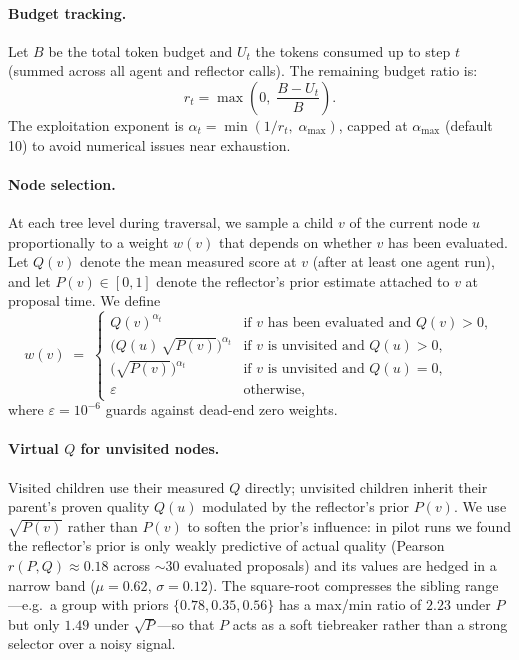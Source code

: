 \documentclass{article}
\begin{document}
\paragraph{Budget tracking.}
Let $B$ be the total token budget and $U_t$ the tokens consumed up to step $t$ (summed across all agent and reflector calls).
The remaining budget ratio is:
\[
    r_t = \max\!\left(0,\; \frac{B - U_t}{B}\right).
\]
The exploitation exponent is $\alpha_t = \min(1/r_t,\; \alpha_{\max})$, capped at $\alpha_{\max}$ (default 10) to avoid numerical issues near exhaustion.

\paragraph{Node selection.}
At each tree level during traversal, we sample a child $v$ of the current node $u$ proportionally to a weight $w(v)$ that depends on whether $v$ has been evaluated.
Let $Q(v)$ denote the mean measured score at $v$ (after at least one agent run), and let $P(v) \in [0,1]$ denote the reflector's prior estimate attached to $v$ at proposal time.
We define
\[
    w(v) \;=\; \begin{cases}
        Q(v)^{\alpha_t}                          & \text{if } v \text{ has been evaluated and } Q(v) > 0,\\[2pt]
        \bigl(Q(u)\,\sqrt{P(v)}\bigr)^{\alpha_t} & \text{if } v \text{ is unvisited and } Q(u) > 0,\\[2pt]
        \bigl(\sqrt{P(v)}\bigr)^{\alpha_t}       & \text{if } v \text{ is unvisited and } Q(u) = 0,\\[2pt]
        \varepsilon                              & \text{otherwise,}
    \end{cases}
\]
where $\varepsilon = 10^{-6}$ guards against dead-end zero weights.

\paragraph{Virtual $Q$ for unvisited nodes.}
Visited children use their measured $Q$ directly; unvisited children inherit their parent's proven quality $Q(u)$ modulated by the reflector's prior $P(v)$.
We use $\sqrt{P(v)}$ rather than $P(v)$ to soften the prior's influence: in pilot runs we found the reflector's prior is only weakly predictive of actual quality (Pearson $r(P, Q) \approx 0.18$ across $\sim$30 evaluated proposals) and its values are hedged in a narrow band ($\mu{=}0.62$, $\sigma{=}0.12$).
The square-root compresses the sibling range---e.g.\ a group with priors $\{0.78, 0.35, 0.56\}$ has a max/min ratio of $2.23$ under $P$ but only $1.49$ under $\sqrt{P}$---so that $P$ acts as a soft tiebreaker rather than a strong selector over a noisy signal.
\end{document}
